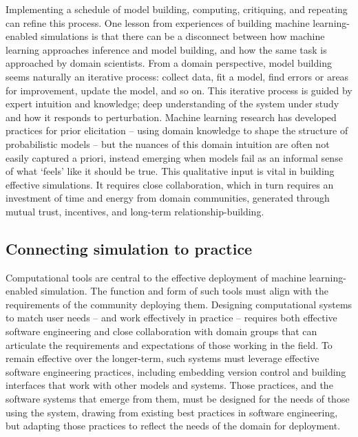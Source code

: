{Implementing a schedule of model building, computing, critiquing, and
repeating can refine this process. One lesson from experiences of
building machine learning-enabled simulations is that there can be a
disconnect between how machine learning approaches inference and model
building, and how the same task is approached by domain scientists. From
a domain perspective, model building seems naturally an iterative
process: collect data, fit a model, find errors or areas for
improvement, update the model, and so on. This iterative process is
guided by expert intuition and knowledge; deep understanding of the
system under study and how it responds to perturbation. Machine learning
research has developed practices for prior elicitation -- using domain
knowledge to shape the structure of probabilistic models -- but the
nuances of this domain intuition are often not easily captured a priori,
instead emerging when models fail as an informal sense of what `feels'
like it should be true. This qualitative input is vital in building
effective simulations. It requires close collaboration, which in turn
requires an investment of time and energy from domain communities,
generated through mutual trust, incentives, and long-term
relationship-building.

\hypertarget{connecting-simulation-to-practice}{%
\subsection{Connecting simulation to
practice}\label{connecting-simulation-to-practice}}

Computational tools are central to the effective deployment of machine
learning-enabled simulation. The function and form of such tools must
align with the requirements of the community deploying them. Designing
computational systems to match user needs -- and work effectively in
practice -- requires both effective software engineering and close
collaboration with domain groups that can articulate the requirements
and expectations of those working in the field. To remain effective over
the longer-term, such systems must leverage effective software
engineering practices, including embedding version control and building
interfaces that work with other models and systems. Those practices, and
the software systems that emerge from them, must be designed for the
needs of those using the system, drawing from existing best practices in
software engineering, but adapting those practices to reflect the needs
of the domain for deployment.

}
